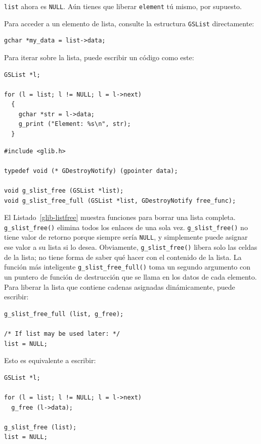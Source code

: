 \lstinline{list} ahora es \lstinline{NULL}. Aún tienes que liberar \lstinline{element} tú mismo, por supuesto.

Para acceder a un elemento de lista, consulte la estructura \lstinline{GSList} directamente:

\begin{lstlisting}[style=GLib/GTK]
gchar *my_data = list->data;
\end{lstlisting}

Para iterar sobre la lista, puede escribir un código como este:

\begin{lstlisting}[style=GLib/GTK]
GSList *l;

for (l = list; l != NULL; l = l->next)
  {
    gchar *str = l->data;
    g_print ("Element: %s\n", str);
  }
\end{lstlisting}

\begin{lstlisting}[style=GLib/GTK, caption={Liberar listas enteras vinculadas}, label=glib-listfree]
#include <glib.h>

typedef void (* GDestroyNotify) (gpointer data);

void g_slist_free (GSList *list);
void g_slist_free_full (GSList *list, GDestroyNotify free_func);
\end{lstlisting}

El Listado~\ref{glib-listfree} muestra funciones para borrar una lista completa. \lstinline{g_slist_free()} elimina todos los enlaces de una sola vez. \lstinline{g_slist_free()} no tiene valor de retorno porque siempre sería \lstinline{NULL}, y simplemente puede asignar ese valor a su lista si lo desea. Obviamente, \lstinline{g_slist_free()} libera solo las celdas de la lista; no tiene forma de saber qué hacer con el contenido de la lista. La función más inteligente \lstinline{g_slist_free_full()} toma un segundo argumento con un puntero de función de destrucción que se llama en los datos de cada elemento. Para liberar la lista que contiene cadenas asignadas dinámicamente, puede escribir:

\begin{lstlisting}[style=GLib/GTK]
g_slist_free_full (list, g_free);

/* If list may be used later: */
list = NULL;
\end{lstlisting}

Esto es equivalente a escribir:

\begin{lstlisting}[style=GLib/GTK]
GSList *l;

for (l = list; l != NULL; l = l->next)
  g_free (l->data);

g_slist_free (list);
list = NULL;
\end{lstlisting}

